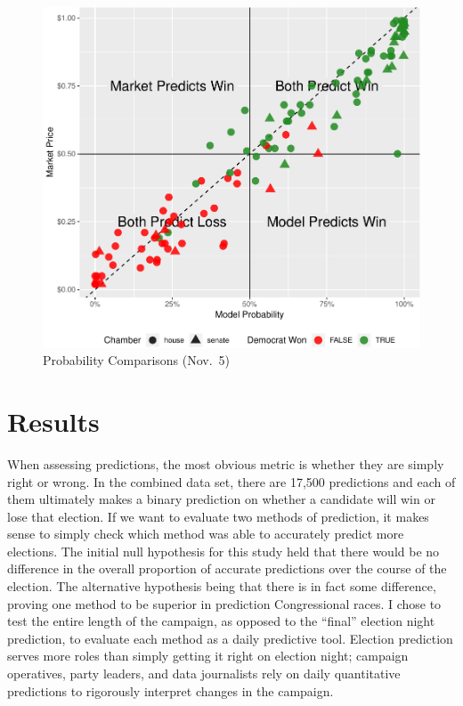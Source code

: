 \documentclass[11pt,]{article}
\begin{document}
\begin{figure}
\centering
\includegraphics{paper_files/figure-latex/plot_cart-1.pdf}
\caption{Probability Comparisons (Nov.~5)}
\end{figure}

\hypertarget{results}{%
\section{Results}\label{results}}

When assessing predictions, the most obvious metric is whether they are
simply right or wrong. In the combined data set, there are 17,500
predictions and each of them ultimately makes a binary prediction on
whether a candidate will win or lose that election. If we want to
evaluate two methods of prediction, it makes sense to simply check which
method was able to accurately predict more elections. The initial null
hypothesis for this study held that there would be no difference in the
overall proportion of accurate predictions over the course of the
election. The alternative hypothesis being that there is in fact some
difference, proving one method to be superior in prediction
Congressional races. I chose to test the entire length of the campaign,
as opposed to the ``final'' election night prediction, to evaluate each
method as a daily predictive tool. Election prediction serves more roles
than simply getting it right on election night; campaign operatives,
party leaders, and data journalists rely on daily quantitative
predictions to rigorously interpret changes in the campaign.
\end{document}
